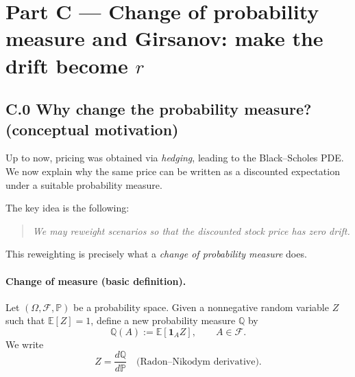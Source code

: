 \documentclass[11pt]{article}
\theoremstyle{definition}
\theoremstyle{remark}
\newcommand{\Pbb}{\mathbb{P}}
\newcommand{\Qbb}{\mathbb{Q}}
\newcommand{\E}{\mathbb{E}}
\newcommand{\1}{\mathbf{1}}
\newcommand{\dd}{\,\mathrm{d}}
\theoremstyle{definition}
\begin{document}



\section*{Part C --- Change of probability measure and Girsanov:
make the drift become $r$}

\subsection*{C.0 Why change the probability measure? (conceptual motivation)}

Up to now, pricing was obtained via \emph{hedging}, leading to the
Black--Scholes PDE.
We now explain why the same price can be written as a discounted expectation
under a suitable probability measure.

The key idea is the following:

\begin{quote}
\emph{We may reweight scenarios so that the discounted stock price has zero drift.}
\end{quote}

This reweighting is precisely what a \emph{change of probability measure} does.

\paragraph{Change of measure (basic definition).}
Let $(\Omega,\mathcal F,\Pbb)$ be a probability space.
Given a nonnegative random variable $Z$ such that $\E[Z]=1$, define a new probability
measure $\Qbb$ by
\[
\Qbb(A):=\E[\mathbf 1_A Z],\qquad A\in\mathcal F.
\]
We write
\[
Z=\frac{d\Qbb}{d\Pbb}
\quad\text{(Radon--Nikodym derivative).}
\]
\end{document}
